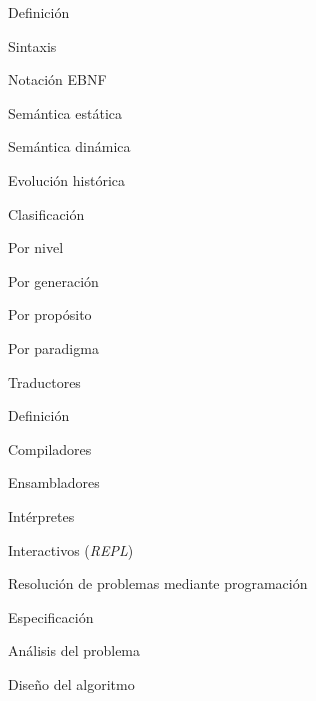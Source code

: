 \begin{longenum}
\begin{longenum}
        \begin{longenum}
            \item Definición
            \begin{longenum}
                \item Sintaxis
                \begin{longenum}
                    \item Notación EBNF
                \end{longenum}
                \item Semántica estática
                \item Semántica dinámica
            \end{longenum}
            \item Evolución histórica
            \item Clasificación
            \begin{longenum}
                \item Por nivel
                \item Por generación
                \item Por propósito
                \item Por paradigma
            \end{longenum}
        \end{longenum}
        \item Traductores
        \begin{longenum}
            \item Definición
            \item Compiladores
            \begin{longenum}
                \item Ensambladores
            \end{longenum}
            \item Intérpretes
            \begin{longenum}
                \item Interactivos (\textit{REPL})
            \end{longenum}
        \end{longenum}
        \item Resolución de problemas mediante programación
        \begin{longenum}
            \item Especificación
            \item Análisis del problema
            \item Diseño del algoritmo

\end{longenum}
\end{longenum}
\end{longenum}

